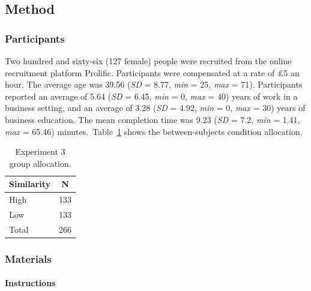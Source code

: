 \documentclass[a4paper, nobind, dvipsnames]{templates/ociamthesis}
\theoremstyle{definition}
\theoremstyle{definition}
\theoremstyle{definition}
\theoremstyle{definition}
\theoremstyle{remark}
\begin{document}
\subsection{Method}

\subsubsection{Participants}

Two hundred and sixty-six (127 female) people were recruited from the online recruitment platform Prolific. Participants were compensated at a rate of £5 an hour. The average age was 39.56 (\emph{SD} = 8.77, \emph{min} = 25, \emph{max} = 71). Participants reported an average of 5.64 (\emph{SD} = 6.45, \emph{min} = 0, \emph{max} = 40) years of work in a business setting, and an average of 3.28 (\emph{SD} = 4.92, \emph{min} = 0, \emph{max} = 30) years of business education. The mean completion time was 9.23 (\emph{SD} = 7.2, \emph{min} = 1.41, \emph{max} = 65.46) minutes.~Table~\ref{tab:condition-allocation-aggregation-3}
shows the between-subjects condition allocation.

\begin{table}[tbp]

\begin{center}
\begin{threeparttable}

\caption{\label{tab:condition-allocation-aggregation-3}Experiment 3 group allocation.}

\begin{tabular}{ll}
\toprule
Similarity & \multicolumn{1}{c}{N}\\
\midrule
High & 133\\
Low & 133\\
Total & 266\\
\bottomrule
\end{tabular}

\end{threeparttable}
\end{center}

\end{table}

\subsubsection{Materials}

\paragraph{Instructions}
\end{document}
